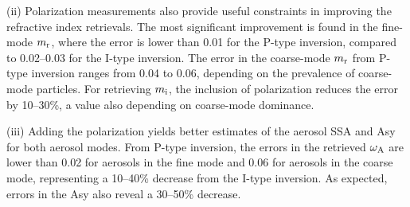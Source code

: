 (ii) Polarization measurements also provide useful constraints in improving the
refractive index retrievals. The most significant improvement is found in the
fine-mode $m_\text{r}$, where the error is lower than 0.01 for the P-type inversion,
compared to 0.02--0.03 for the I-type inversion. The error in the coarse-mode
$m_\text{r}$ from P-type inversion ranges from 0.04 to 0.06, depending on the prevalence
of coarse-mode particles. For retrieving $m_\text{i}$, the inclusion of polarization
reduces the error by 10--30\%, a value also depending on coarse-mode dominance. 

(iii) Adding the polarization yields better estimates of the aerosol SSA and
Asy for both aerosol modes. From P-type inversion, the errors in the retrieved
$\omega_\text{A}$ are lower than 0.02 for aerosols in the fine mode and 0.06 for aerosols in
the coarse mode, representing a 10--40\% decrease from the I-type inversion. As
expected, errors in the Asy also reveal a 30--50\% decrease. 


